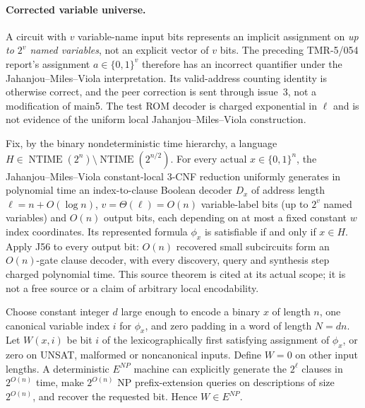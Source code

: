 \documentclass[11pt]{article}
\begin{document}
\paragraph{Corrected variable universe.}
A circuit with $v$ variable-name input bits represents
an implicit assignment on \emph{up to $2^v$ named
variables}, not an explicit vector of $v$ bits.
The preceding TMR-5/054 report's assignment
$a\in\{0,1\}^v$ therefore has an incorrect
quantifier under the Jahanjou--Miles--Viola
interpretation. Its valid-address counting identity
is otherwise correct, and the peer correction is
sent through issue~3, not a modification of main5.
The test ROM decoder is charged exponential in
$\ell$ and is not evidence of the uniform local
Jahanjou--Miles--Viola construction.

Fix, by the binary nondeterministic time hierarchy, a language
$H\in\operatorname{NTIME}(2^n)\setminus\operatorname{NTIME}(2^{n/2})$.
For every actual $x\in\{0,1\}^n$, the Jahanjou--Miles--Viola
constant-local 3-CNF reduction uniformly generates in polynomial time an
index-to-clause Boolean decoder $D_x$ of address length
$\ell=n+O(\log n)$, $v=\Theta(\ell)=O(n)$ variable-label bits (up to $2^v$ named variables) and $O(n)$ output bits,
each depending on at most a fixed constant $w$ index coordinates.
Its represented formula $\phi_x$ is satisfiable if and only if $x\in H$.
Apply J56 to every output bit: $O(n)$ recovered small subcircuits form an
$O(n)$-gate clause decoder, with every discovery, query and synthesis step
charged polynomial time. This source theorem is cited at its actual scope;
it is not a free source or a claim of arbitrary local encodability.

Choose constant integer $d$ large enough to encode a binary $x$ of length
$n$, one canonical variable index $i$ for $\phi_x$, and zero padding
in a word of length $N=dn$. Let $W(x,i)$ be bit $i$ of the lexicographically
first satisfying assignment of $\phi_x$, or zero on UNSAT, malformed
or noncanonical inputs. Define $W=0$ on other input lengths. A deterministic
$E^{NP}$ machine can explicitly generate the $2^{\ell}$ clauses in
$2^{O(n)}$ time, make $2^{O(n)}$ NP prefix-extension queries on descriptions
of size $2^{O(n)}$, and recover the requested bit. Hence $W\in E^{NP}$.
\end{document}
